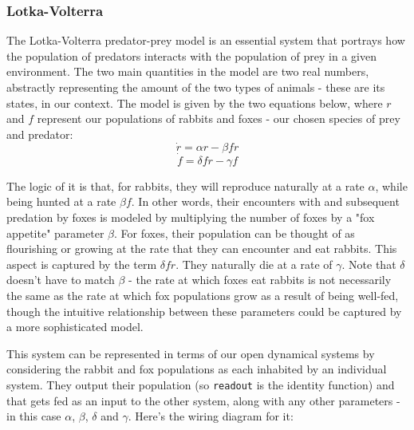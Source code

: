 \subsubsection{Lotka-Volterra}

The Lotka-Volterra predator-prey model is an essential system \cite{Murray2002} that portrays how the population of predators interacts with the population of prey in a given environment. The two main quantities in the model are two real numbers, abstractly representing the amount of the two types of animals - these are its states, in our context. The model is given by the two equations below, where $r$ and $f$ represent our populations of rabbits and foxes - our chosen species of prey and predator:
\begin{equation}
\dot{r} = \alpha r - \beta f r
\label{eq:rabbits}
\end{equation}
\begin{equation}
\dot{f} = \delta f r - \gamma f
\label{eq:foxes}
\end{equation}

The logic of it is that, for rabbits, they will reproduce naturally at a rate $\alpha$, while being hunted at a rate $\beta f$. In other words, their encounters with and subsequent predation by foxes is modeled by multiplying the number of foxes by a "fox appetite" parameter $\beta$. For foxes, their population can be thought of as flourishing or growing at the rate that they can encounter and eat rabbits. This aspect is captured by the term $\delta f r$. They naturally die at a rate of $\gamma$. Note that $\delta$ doesn't have to match $\beta$ - the rate at which foxes eat rabbits is not necessarily the same as the rate at which fox populations grow as a result of being well-fed, though the intuitive relationship between these parameters could be captured by a more sophisticated model.

This system can be represented in terms of our open dynamical systems by considering the rabbit and fox populations as each inhabited by an individual system. They output their population (so \texttt{readout} is the identity function) and that gets fed as an input to the other system, along with any other parameters - in this case $\alpha$, $\beta$, $\delta$ and $\gamma$. Here's the wiring diagram for it:

